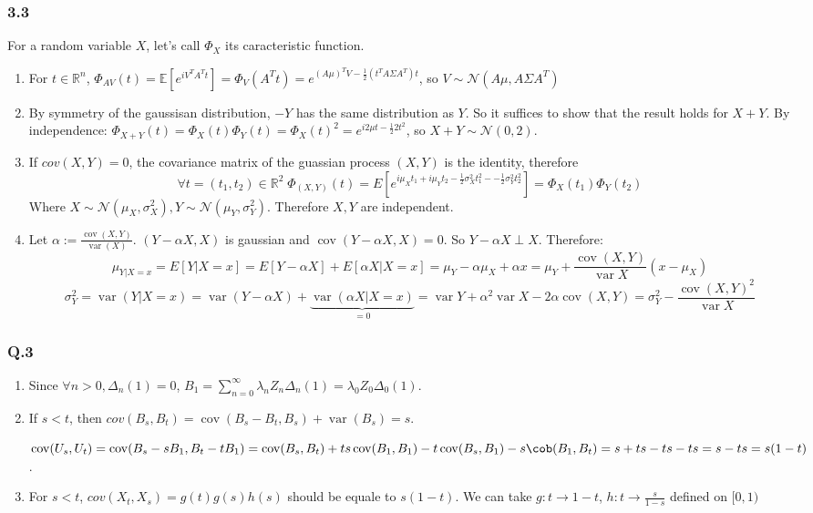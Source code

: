 \documentclass[12pt]{article}
\newcommand{\Q}[1]{\subsubsection*{Q.#1}}
\DeclareMathOperator{\cov}{cov}
\DeclareMathOperator{\var}{var}
\begin{document}
\subsubsection*{3.3}
For a random variable $X$, let's call $\Phi_X$ its caracteristic function.
\begin{enumerate}[label=(\alph*)]
\item 
  For $t \in \mathbb R^n$, $\Phi_{AV}(t) = \mathbb E[ e^{i V^TA^Tt} ] = \Phi_{V}(A^Tt) = e^{(A\mu)^TV - \frac12 (t^T A \Sigma A^T) t}$, so $V \sim \mathcal N(A\mu, A\Sigma A^T)$
\item By symmetry of the gaussisan distribution, $-Y$ has the same distribution as $Y$. So it suffices to show that the result holds for $X+Y$.
  By independence: $\Phi_{X+Y}(t) = \Phi_X(t) \Phi_Y(t) = \Phi_X(t)^2 = e^{i2\mu t - \frac12 2 t^2 }$, so $X+Y \sim \mathcal N(0, 2)$.
\item If $cov(X, Y) = 0$, the covariance matrix of the guassian process $(X, Y)$ is the identity, therefore $$\forall t = (t_1, t_2) \in \mathbb R^2 \; \Phi_{(X, Y)}(t) = E[e^{i \mu_X t_1 + i \mu_Y t_2 - \frac12 \sigma_X^2t_1^2 -  - \frac12 \sigma_Y^2t_2^2}] = \Phi_X(t_1) \Phi_Y(t_2)$$
  Where $X \sim \mathcal N(\mu_X, \sigma_X^2), Y \sim \mathcal N(\mu_Y, \sigma_Y^2)$.
  Therefore $X, Y$ are independent.
\item Let $\alpha := \frac{\cov(X, Y)}{\var(X)}$. $(Y - \alpha X, X)$ is gaussian and $\cov(Y - \alpha X, X) = 0$. So $Y - \alpha X \perp X$. Therefore:
  $$\mu_{Y | X = x} = E[Y | X = x] = E[Y - \alpha X]+ E[\alpha X | X = x] = \mu_Y - \alpha \mu_X + \alpha x = \mu_Y + \frac{\cov(X,Y)}{\var X} (x - \mu_X)$$
  $$\sigma_Y^2 = \var(Y | X = x) = \var(Y - \alpha X) + \underbrace{\var(\alpha X | X = x)}_{=0} = \var Y + \alpha^2 \var X - 2\alpha \cov(X, Y) = \sigma_Y^2 - \frac{\cov(X,Y)^2}{\var X}$$
\end{enumerate}

\Q{3}
\begin{enumerate}[label=(\alph*)]
\item Since $\forall n > 0, \Delta_n(1) = 0$, $B_1 = \sum_{n=0}^{\infty} \lambda_n Z_n \Delta_n(1) = \lambda_0 Z_0 \Delta_0(1)$.
\item
  If $s < t$, then $cov(B_s, B_t) = \cov(B_s - B_t, B_s) + \var(B_s) = s$.
  
  $\cov(U_s, U_t) = \cov(B_s - sB_1, B_t -tB_1) = \cov(B_s, B_t) + ts \cov(B_1, B_1) - t \cov(B_s, B_1) - s\cob(B_1, B_t) = s + ts - ts - ts = s - ts = s(1- t)$.

\item
  For $s < t$, $cov(X_t, X_s) = g(t)g(s) h(s)$ should be equale to $s(1-t)$.
  We can take $g: t \rightarrow 1 - t$, $h: t \rightarrow \frac s{1 - s}$ defined on $[0, 1)$

\end{enumerate}
\end{document}

